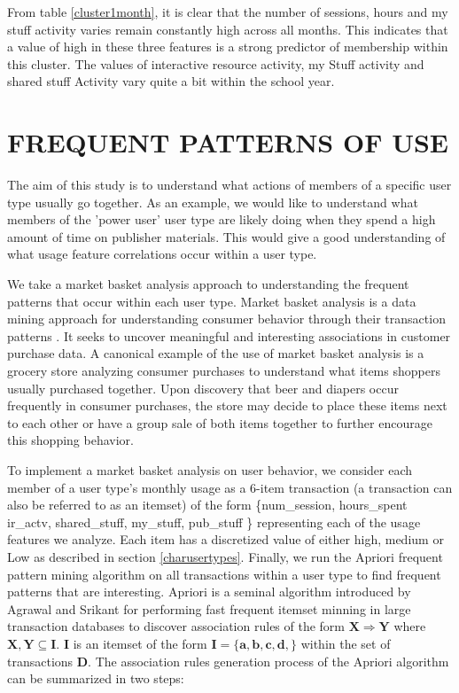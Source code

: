\documentclass{acm_proc_article-sp}
\begin{document}
From table \ref{cluster1month}, it is clear that the number of sessions, hours and my stuff activity varies remain constantly high across all months. This indicates that a value of high in these three features is a strong predictor of membership within this cluster.  The values of interactive resource activity, my Stuff activity and shared stuff Activity vary quite a bit within the school year.

\section{FREQUENT PATTERNS OF USE}
The aim of this study is to understand what actions of members of a specific user type usually go together. As an example, we would like to understand what members of the 'power user' user type are likely doing when they spend a high amount of time on publisher materials. This would give a good understanding of what usage feature correlations occur within a user type.

We take a market basket analysis approach to understanding the frequent patterns that occur within each user type. Market basket analysis is a data mining approach for understanding consumer behavior through their transaction patterns \cite{han2006data}. It seeks to uncover meaningful and interesting associations in customer purchase data. A canonical example of the use of  market basket analysis is a grocery store analyzing consumer purchases to understand what items shoppers usually purchased together. Upon discovery that beer and diapers occur frequently in consumer purchases, the store may decide to place these items next to each other or have a group sale of both items together to further encourage this shopping behavior.

To implement a market basket analysis on user behavior, we consider each member of a user type's monthly usage as a 6-item transaction (a transaction can also be referred to as an itemset) of the form \{num\_session, hours\_spent ir\_actv, shared\_stuff, my\_stuff, pub\_stuff \} representing each of the usage features we analyze. Each item has a discretized value of either high, medium or Low as described in section \ref{charusertypes}. Finally, we run the Apriori frequent pattern mining algorithm on all transactions within a user type to find frequent patterns that are interesting. Apriori is a seminal algorithm introduced by Agrawal and Srikant \cite{agrawal} for performing fast frequent itemset minning in large transaction databases to discover association rules of the form $\mathbf{{X} \Longrightarrow {Y}}$ where $\mathbf{X, Y \subseteq I}$. $\mathbf{I}$ is an itemset of the form $\mathbf{I = \{a,b,c,d,\}}$ within the set of transactions $\mathbf{D}$.
The association rules generation process of the Apriori algorithm can be summarized in two steps:
\end{document}
